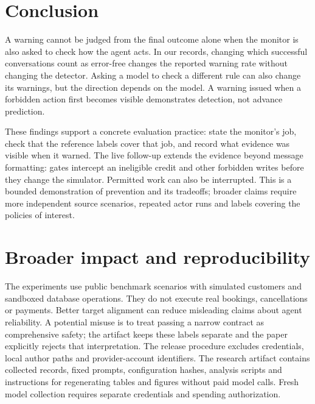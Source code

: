 \documentclass[10pt]{article}
\begin{document}
\section{Conclusion}
A warning cannot be judged from the final outcome alone when the monitor is also asked to check how the agent acts. In our records, changing which successful conversations count as error-free changes the reported warning rate without changing the detector. Asking a model to check a different rule can also change its warnings, but the direction depends on the model. A warning issued when a forbidden action first becomes visible demonstrates detection, not advance prediction.

These findings support a concrete evaluation practice: state the monitor's job, check that the reference labels cover that job, and record what evidence was visible when it warned. The live follow-up extends the evidence beyond message formatting: gates intercept an ineligible credit and other forbidden writes before they change the simulator. Permitted work can also be interrupted. This is a bounded demonstration of prevention and its tradeoffs; broader claims require more independent source scenarios, repeated actor runs and labels covering the policies of interest.

\section*{Broader impact and reproducibility}
The experiments use public benchmark scenarios with simulated customers and sandboxed database operations. They do not execute real bookings, cancellations or payments. Better target alignment can reduce misleading claims about agent reliability. A potential misuse is to treat passing a narrow contract as comprehensive safety; the artifact keeps these labels separate and the paper explicitly rejects that interpretation. The release procedure excludes credentials, local author paths and provider-account identifiers. The research artifact contains collected records, fixed prompts, configuration hashes, analysis scripts and instructions for regenerating tables and figures without paid model calls. Fresh model collection requires separate credentials and spending authorization.




\appendix
\end{document}
